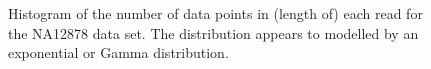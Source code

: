 \begin{figure}
	\centering

\caption{\label{fig:n-hist}Histogram of the number of data points in (length of) each read for the NA12878 data set. The distribution appears to modelled by an exponential or Gamma distribution.}
\end{figure}
